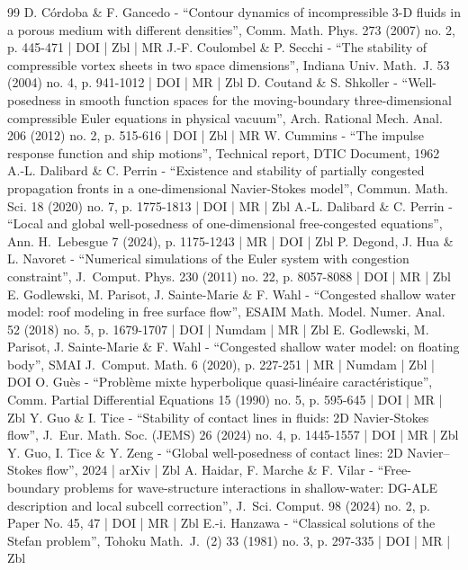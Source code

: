 \begin{thebibliography}{99}
D. Córdoba \& F. Gancedo - “Contour dynamics of incompressible 3-D fluids in a porous medium with different densities”, Comm. Math. Phys. 273 (2007) no. 2, p. 445-471 | DOI | Zbl | MR
J.-F. Coulombel \& P. Secchi - “The stability of compressible vortex sheets in two space dimensions”, Indiana Univ. Math. J. 53 (2004) no. 4, p. 941-1012 | DOI | MR | Zbl
D. Coutand \& S. Shkoller - “Well-posedness in smooth function spaces for the moving-boundary three-dimensional compressible Euler equations in physical vacuum”, Arch. Rational Mech. Anal. 206 (2012) no. 2, p. 515-616 | DOI | Zbl | MR
W. Cummins - “The impulse response function and ship motions”, Technical report, DTIC Document, 1962
A.-L. Dalibard \& C. Perrin - “Existence and stability of partially congested propagation fronts in a one-dimensional Navier-Stokes model”, Commun. Math. Sci. 18 (2020) no. 7, p. 1775-1813 | DOI | MR | Zbl
A.-L. Dalibard \& C. Perrin - “Local and global well-posedness of one-dimensional free-congested equations”, Ann. H. Lebesgue 7 (2024), p. 1175-1243 | MR | DOI | Zbl
P. Degond, J. Hua \& L. Navoret - “Numerical simulations of the Euler system with congestion constraint”, J. Comput. Phys. 230 (2011) no. 22, p. 8057-8088 | DOI | MR | Zbl
E. Godlewski, M. Parisot, J. Sainte-Marie \& F. Wahl - “Congested shallow water model: roof modeling in free surface flow”, ESAIM Math. Model. Numer. Anal. 52 (2018) no. 5, p. 1679-1707 | DOI | Numdam | MR | Zbl
E. Godlewski, M. Parisot, J. Sainte-Marie \& F. Wahl - “Congested shallow water model: on floating body”, SMAI J. Comput. Math. 6 (2020), p. 227-251 | MR | Numdam | Zbl | DOI
O. Guès - “Problème mixte hyperbolique quasi-linéaire caractéristique”, Comm. Partial Differential Equations 15 (1990) no. 5, p. 595-645 | DOI | MR | Zbl
Y. Guo \& I. Tice - “Stability of contact lines in fluids: 2D Navier-Stokes flow”, J. Eur. Math. Soc. (JEMS) 26 (2024) no. 4, p. 1445-1557 | DOI | MR | Zbl
Y. Guo, I. Tice \& Y. Zeng - “Global well-posedness of contact lines: 2D Navier–Stokes flow”, 2024 | arXiv | Zbl
A. Haidar, F. Marche \& F. Vilar - “Free-boundary problems for wave-structure interactions in shallow-water: DG-ALE description and local subcell correction”, J. Sci. Comput. 98 (2024) no. 2, p. Paper No. 45, 47 | DOI | MR | Zbl
E.-i. Hanzawa - “Classical solutions of the Stefan problem”, Tohoku Math. J. (2) 33 (1981) no. 3, p. 297-335 | DOI | MR | Zbl

\end{thebibliography}

